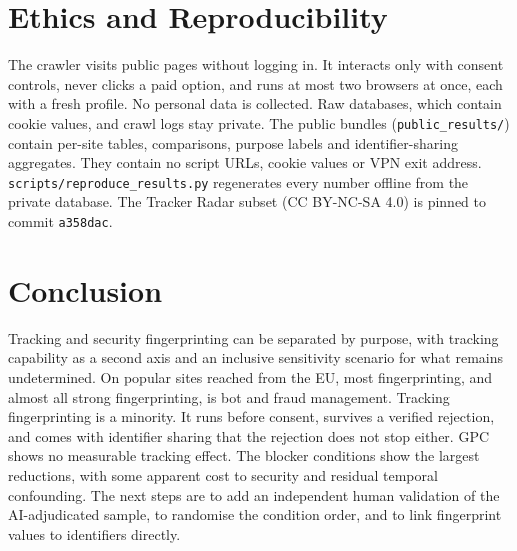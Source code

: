 \documentclass[sigconf,review,anonymous]{acmart}
\begin{document}
\section{Ethics and Reproducibility}
The crawler visits public pages without logging in. It interacts only with consent controls, never
clicks a paid option, and runs at most two browsers at once, each with a fresh profile. No personal
data is collected. Raw databases, which contain cookie values, and crawl logs stay private. The
public bundles (\texttt{public\_results/}) contain per-site tables, comparisons, purpose labels and
identifier-sharing aggregates. They contain no script URLs, cookie values or VPN exit address.
\texttt{scripts/reproduce\_results.py} regenerates every number offline from the private database.
The Tracker Radar subset (CC BY-NC-SA 4.0) is pinned to commit \texttt{a358dac}.

\section{Conclusion}
Tracking and security fingerprinting can be separated by purpose, with tracking capability as a
second axis and an inclusive sensitivity scenario for what remains undetermined. On popular sites reached from
the EU, most fingerprinting, and almost all strong fingerprinting, is bot and fraud management.
Tracking fingerprinting is a minority. It runs before consent, survives a verified rejection,
and comes with identifier sharing that the rejection does not stop either. GPC shows no
measurable tracking effect. The blocker conditions show the largest reductions, with some apparent
cost to security and residual temporal confounding. The next steps are to add an independent human
validation of the AI-adjudicated sample, to randomise the condition order, and to link fingerprint
values to identifiers directly.



\end{document}
